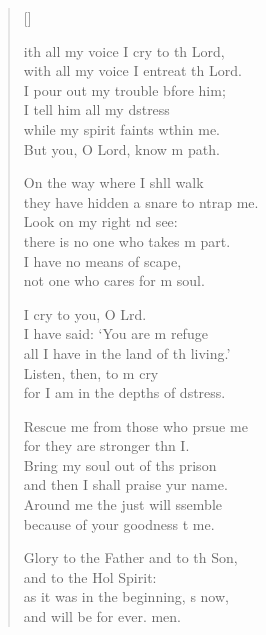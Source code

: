 \begin{verse}[\versewidth]
\begin{patverse}
ith all my voice I cry to th Lord,\Med\\
    with all my voice I entreat th Lord.\\
I pour out my trouble bfore him;\Med\\
    I tell him all my d\pointup{\i}stress\\
while my spirit faints w\pointup{\i}thin me.\Med\\
    But you, O Lord, know m path.

On the way where I shll walk\Med\\
    they have hidden a snare to ntrap me.\\
Look on my right nd see:\Med\\
    there is no one who takes m part.\\
I have no means of scape,\Med\\
    not one who cares for m soul.

I cry to you, O Lrd.\Flex\\
    I have said: ‘You are m refuge\Med\\
    all I have in the land of th living.’\\
Listen, then, to m cry\Med\\
    for I am in the depths of d\pointup{\i}stress.

Rescue me from those who prsue me\Med\\
    for they are stronger thn I.\\
Bring my soul out of th\pointup{\i}s prison\Med\\
    and then I shall praise yur name.\\
Around me the just will ssemble\Med\\
    because of your goodness t me.

Glory to the Father and to th Son,\Med\\
    and to the Hol Spirit:\\
as it was in the beginning, \pointup{\i}s now,\Med\\
    and will be for ever. men.
\end{patverse}
\end{verse}
